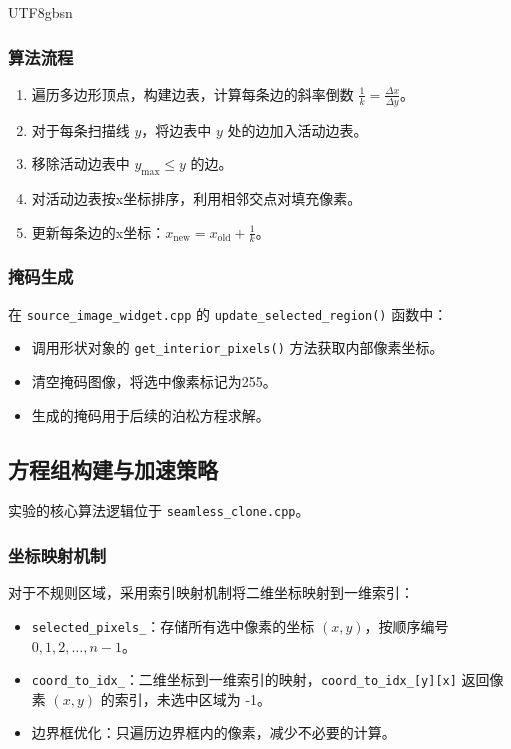 \documentclass[11pt,a4paper]{article}
\begin{document}
\begin{CJK*}{UTF8}{gbsn}
\subsubsection{算法流程}
\begin{enumerate}
    \item 遍历多边形顶点，构建边表，计算每条边的斜率倒数 $\frac{1}{k} = \frac{\Delta x}{\Delta y}$。
    \item 对于每条扫描线 $y$，将边表中 $y$ 处的边加入活动边表。
    \item 移除活动边表中 $y_{\max} \leq y$ 的边。
    \item 对活动边表按x坐标排序，利用相邻交点对填充像素。
    \item 更新每条边的x坐标：$x_{\text{new}} = x_{\text{old}} + \frac{1}{k}$。
\end{enumerate}

\subsubsection{掩码生成}
在 \texttt{source\_image\_widget.cpp} 的 \texttt{update\_selected\_region()} 函数中：
\begin{itemize}
    \item 调用形状对象的 \texttt{get\_interior\_pixels()} 方法获取内部像素坐标。
    \item 清空掩码图像，将选中像素标记为255。
    \item 生成的掩码用于后续的泊松方程求解。
\end{itemize}

\subsection{方程组构建与加速策略}
实验的核心算法逻辑位于 \texttt{seamless\_clone.cpp}。

\subsubsection{坐标映射机制}
对于不规则区域，采用索引映射机制将二维坐标映射到一维索引：
\begin{itemize}
    \item \texttt{selected\_pixels\_}：存储所有选中像素的坐标 $(x, y)$，按顺序编号 $0, 1, 2, \ldots, n-1$。
    \item \texttt{coord\_to\_idx\_}：二维坐标到一维索引的映射，\texttt{coord\_to\_idx\_[y][x]} 返回像素 $(x,y)$ 的索引，未选中区域为 -1。
    \item 边界框优化：只遍历边界框内的像素，减少不必要的计算。
\end{itemize}


\end{CJK*}
\end{document}
